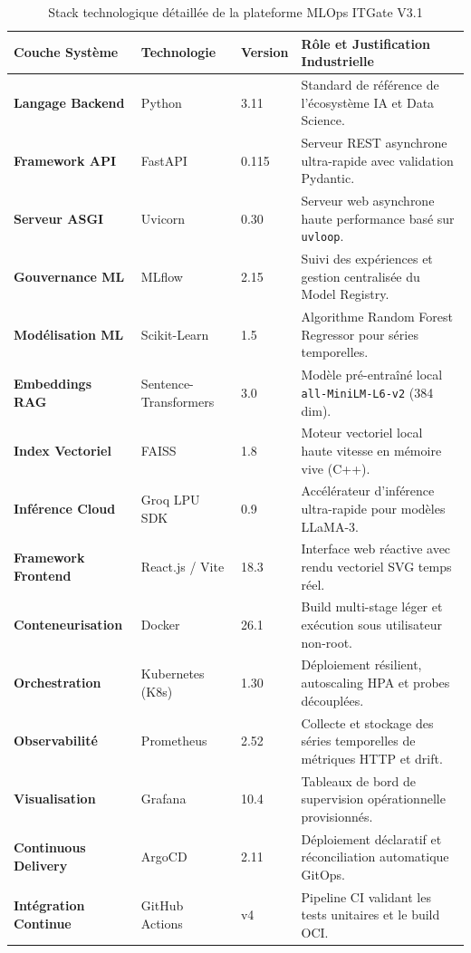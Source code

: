 \documentclass[11pt,a4paper,oneside]{report}
\begin{document}
\begin{table}[H]
\centering
\small
{}
\begin{tabularx}{\textwidth}{@{}lllX@{}}
\toprule
\textbf{Couche Système} & \textbf{Technologie} & \textbf{Version} & \textbf{Rôle et Justification Industrielle} \\ \midrule
\textbf{Langage Backend} & Python & 3.11 & Standard de référence de l'écosystème IA et Data Science. \\
\textbf{Framework API} & FastAPI & 0.115 & Serveur REST asynchrone ultra-rapide avec validation Pydantic. \\
\textbf{Serveur ASGI} & Uvicorn & 0.30 & Serveur web asynchrone haute performance basé sur \texttt{uvloop}. \\
\textbf{Gouvernance ML} & MLflow & 2.15 & Suivi des expériences et gestion centralisée du Model Registry. \\
\textbf{Modélisation ML} & Scikit-Learn & 1.5 & Algorithme Random Forest Regressor pour séries temporelles. \\
\textbf{Embeddings RAG} & Sentence-Transformers & 3.0 & Modèle pré-entraîné local \texttt{all-MiniLM-L6-v2} (384 dim). \\
\textbf{Index Vectoriel} & FAISS & 1.8 & Moteur vectoriel local haute vitesse en mémoire vive (C++). \\
\textbf{Inférence Cloud} & Groq LPU SDK & 0.9 & Accélérateur d'inférence ultra-rapide pour modèles LLaMA-3. \\
\textbf{Framework Frontend} & React.js / Vite & 18.3 & Interface web réactive avec rendu vectoriel SVG temps réel. \\
\textbf{Conteneurisation} & Docker & 26.1 & Build multi-stage léger et exécution sous utilisateur non-root. \\
\textbf{Orchestration} & Kubernetes (K8s) & 1.30 & Déploiement résilient, autoscaling HPA et probes découplées. \\
\textbf{Observabilité} & Prometheus & 2.52 & Collecte et stockage des séries temporelles de métriques HTTP et drift. \\
\textbf{Visualisation} & Grafana & 10.4 & Tableaux de bord de supervision opérationnelle provisionnés. \\
\textbf{Continuous Delivery} & ArgoCD & 2.11 & Déploiement déclaratif et réconciliation automatique GitOps. \\
\textbf{Intégration Continue} & GitHub Actions & v4 & Pipeline CI validant les tests unitaires et le build OCI. \\ \bottomrule
\end{tabularx}
\caption{Stack technologique détaillée de la plateforme MLOps ITGate V3.1}
\label{tab:tech_stack_master}
\end{table}
\end{document}
